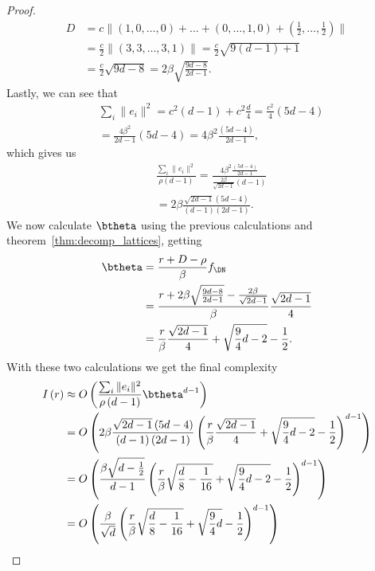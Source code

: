 \begin{proof}
    \begin{align*}
        D&=c\|\left(1,0,\dots,0\right) + \dots + \left(0,\dots,1,0\right)+\left(\frac{1}{2},\dots,\frac{1}{2}\right)\|\\
        &=\frac{c}{2}\|\left(3,3,\dots,3,1\right)\|=\frac{c}{2}\sqrt{9\left(d-1\right)+1}\\
        &=\frac{c}{2}\sqrt{9d-8}=2\beta\sqrt{\frac{9d-8}{2d-1}}.
    \end{align*}
    Lastly, we can see that 
    \begin{align*}
        &\sum_i \|e_i\|^2 =c^2\left(d-1\right)+c^2\frac{d}{4}=\frac{c^2}{4}\left(5d-4\right)\\
        &=\frac{4\beta^2}{2d-1}\left(5d-4\right)=
        4\beta^2\frac{\left(5d-4\right)}{2d-1},
    \end{align*}
    which gives us
    \begin{align*}
        &\frac{\sum_i\|e_i\|^2}{\rho\left(d-1\right)}=
        \frac{4\beta^2\frac{\left(5d-4\right)}{2d-1}}{\frac{2\beta}{\sqrt{2d-1}}\left(d-1\right)}\\
        &=2\beta\frac{\sqrt{2d-1}\left(5d-4\right)}{\left(d-1\right)\left(2d-1\right)}.
    \end{align*}
    We now calculate $\btheta$ using the previous calculations and theorem~\ref{thm:decomp_lattices}, getting
    \begin{align*}
        \btheta &= \frac{r+D-\rho}{\beta}f_{\DN}\\
        &= \frac{r+2\beta\sqrt{\frac{9d-8}{2d-1}}-\frac{2\beta}{\sqrt{2d-1}}}{\beta}\frac{\sqrt{2d-1}}{4}\\
        &= \frac{r}{\beta}\frac{\sqrt{2d-1}}{4}+\sqrt{\frac{9}{4}d-2}-\frac{1}{2}.
    \end{align*}
    With these two calculations we get the final complexity
    \begin{align*}
        I\left(r\right)&\approx O\left(\frac{\sum_i\|e_i\|^2}{\rho\left(d-1\right)}\btheta^{d-1}\right)\\
        &=O\left(2\beta\frac{\sqrt{2d-1}\left(5d-4\right)}{\left(d-1\right)\left(2d-1\right)}\left(\frac{r}{\beta}\frac{\sqrt{2d-1}}{4}+\sqrt{\frac{9}{4}d-2}-\frac{1}{2}\right)^{d-1}\right)\\
        &=O\left(\frac{\beta\sqrt{d-\frac{1}{2}}}{d-1}\left(\frac{r}{\beta}\sqrt{\frac{d}{8}-\frac{1}{16}}+\sqrt{\frac{9}{4}d-2}-\frac{1}{2}\right)^{d-1}\right)\\
        &=O\left(\frac{\beta}{\sqrt{d}}\left(\frac{r}{\beta}\sqrt{\frac{d}{8}-\frac{1}{16}}+\sqrt{\frac{9}{4}d}-\frac{1}{2}\right)^{d-1}\right)\\

\end{align*}
\end{proof}
